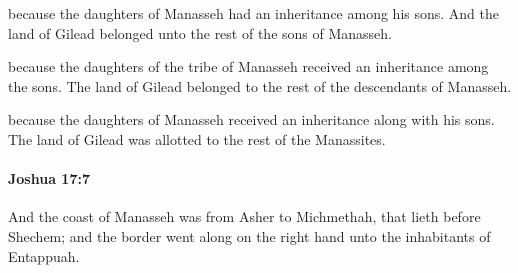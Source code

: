 			\begin{versebox}
					\item[BHS] 
					\item[ASV] because the daughters of Manasseh had an inheritance among his sons. And the land of Gilead belonged unto the rest of the sons of Manasseh.
					\item[NIV] because the daughters of the tribe of Manasseh received an inheritance among the sons. The land of Gilead belonged to the rest of the descendants of Manasseh.
					\item[NRSV] because the daughters of Manasseh received an inheritance along with his sons. The land of Gilead was allotted to the rest of the Manassites.
			\end{versebox}

		\paragraph{Joshua 17:7} %
			\label{JOSHUA-17-7}

			And the coast of Manasseh was from Asher to Michmethah, that lieth before Shechem; and the border went along on the right hand unto the inhabitants of Entappuah.

